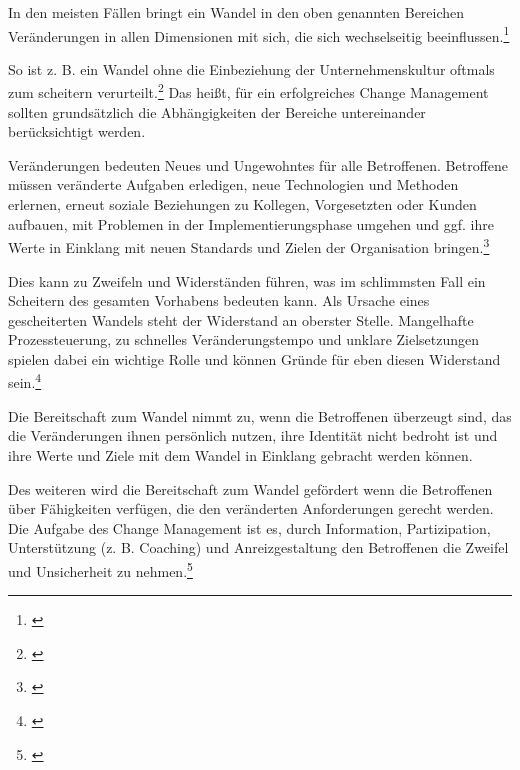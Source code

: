 In den meisten Fällen bringt ein Wandel in den oben genannten Bereichen Veränderungen in allen Dimensionen mit sich, die sich wechselseitig beeinflussen.\footnote{\cite{fisch_veraenderungen_2008}} 

So ist z. B. ein Wandel ohne die Einbeziehung der Unternehmenskultur oftmals zum scheitern verurteilt.\footnote{\cite{lauer_change_2014}} Das heißt, für ein erfolgreiches Change Management sollten grundsätzlich die Abhängigkeiten der Bereiche untereinander berücksichtigt werden.

Veränderungen bedeuten Neues und Ungewohntes für alle Betroffenen. 
Betroffene müssen veränderte Aufgaben erledigen, neue Technologien und Methoden erlernen, erneut soziale Beziehungen zu Kollegen, Vorgesetzten oder Kunden aufbauen, mit Problemen in der Implementierungsphase umgehen und ggf. ihre Werte in Einklang mit neuen Standards und Zielen der Organisation bringen.\footnote{\cite{fisch_veraenderungen_2008}}

Dies kann zu Zweifeln und Widerständen führen, was im schlimmsten Fall ein Scheitern des gesamten Vorhabens bedeuten kann. Als Ursache eines gescheiterten Wandels steht der Widerstand an oberster Stelle. Mangelhafte Prozessteuerung, zu schnelles Veränderungstempo und unklare Zielsetzungen spielen dabei ein wichtige Rolle und können Gründe für eben diesen Widerstand sein.\footnote{\cite{lauer_change_2014}}

Die Bereitschaft zum Wandel nimmt zu, wenn die Betroffenen überzeugt sind, das die Veränderungen ihnen persönlich nutzen, ihre Identität nicht bedroht ist und ihre Werte und Ziele mit dem Wandel in Einklang gebracht werden können.

Des weiteren wird die Bereitschaft zum Wandel gefördert wenn die Betroffenen über Fähigkeiten verfügen, die den veränderten Anforderungen gerecht werden. Die Aufgabe des Change Management ist es, durch Information, Partizipation, Unterstützung (z. B. Coaching) und Anreizgestaltung den Betroffenen die Zweifel und Unsicherheit zu nehmen.\footnote{\cite{fisch_veraenderungen_2008}} 

